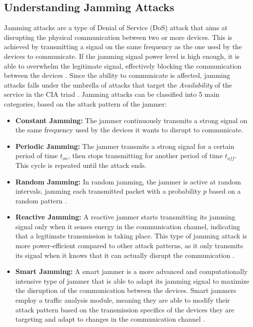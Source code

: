 \documentclass[futureinternet,article,submit,pdftex,moreauthors]{Definitions/mdpi}
\begin{document}
\subsection{Understanding Jamming Attacks}

Jamming attacks are a type of Denial of Service (DoS) attack that aims at disrupting the physical communication between two or more devices. 
This is achieved by transmitting a signal on the same frequency as the one used by the devices to communicate. If the jamming signal power level is high enough, 
it is able to overwhelm the legitimate signal, effectively blocking the communication between the devices \cite{DroneCommHassija}. 
Since the ability to communicate is affected, jamming attacks falls under the umbrella of attacks that target the \textit{Availability} of the service in the CIA triad \cite{DataIntegrityCawthra}. 
Jamming attacks can be classified into 5 main categories, based on the attack pattern of the jammer: 

\begin{itemize}
    \item \textbf{Constant Jamming:} The jammer continuously transmits a strong signal on the same frequency used by the devices it wants to disrupt to communicate. 
    \item \textbf{Periodic Jamming:} The jammer transmits a strong signal for a certain period of time \(t_{on}\), then stops transmitting for another period of time \(t_{off}\). This cycle is repeated until the attack ends.
    \item \textbf{Random Jamming:} In random jamming, the jammer is active at random intervals, jamming each transmitted packet with a probability 
    \(p\) based on a random pattern \cite{VANETsAI-Lyamin}. 
    \item \textbf{Reactive Jamming:} A reactive jammer starts transmitting its jamming signal only when it senses energy in the communication channel, 
    indicating that a legitimate transmission is taking place. This type of jamming attack is more power-efficient compared to other 
    attack patterns, as it only transmits its signal when it knows that it can actually disrupt the communication \cite{MLMisbehavior5GBoualouache}.
    \item \textbf{Smart Jamming:} A smart jammer is a more advanced and computationally intensive type of jammer that is able to adapt its jamming signal to 
    maximize the disruption of the communication between the devices. Smart jammers employ a traffic analysis module, meaning they are able to modify their attack pattern based on the 
    transmission specifics of the devices they are targeting and adapt to changes in the communication channel \cite{AntiJammingV2V-Feng}. 
\end{itemize}
\end{document}
